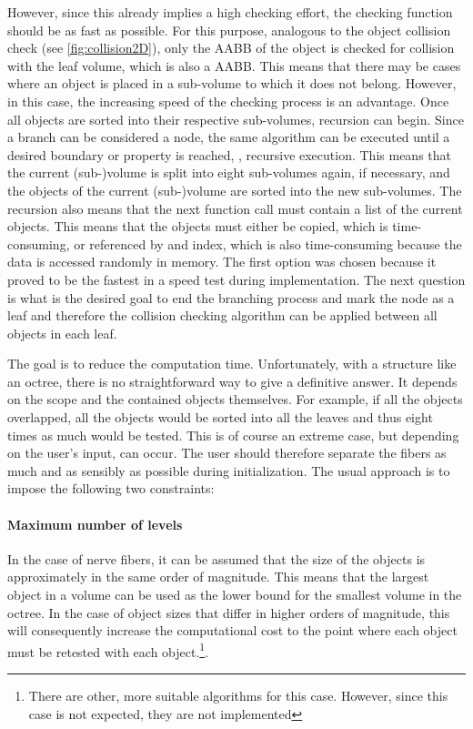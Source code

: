 However, since this already implies a high checking effort, the checking function should be as fast as possible.
For this purpose, analogous to the object collision check (see \cref{fig:collision2D}), only the \ac{AABB} of the object is checked for collision with the leaf volume, which is also a \ac{AABB}.
This means that there may be cases where an object is placed in a sub-volume to which it does not belong.
However, in this case, the increasing speed of the checking process is an advantage.
Once all objects are sorted into their respective sub-volumes, recursion can begin.
Since a branch can be considered a node, the same algorithm can be executed until a desired boundary or property is reached, \ie{}, recursive execution.
This means that the current (sub-)volume is split into eight sub-volumes again, if necessary, and the objects of the current (sub-)volume are sorted into the new sub-volumes.
The recursion also means that the next function call must contain a list of the current objects.
This means that the objects must either be copied, which is time-consuming, or referenced by \eg{} and index, which is also time-consuming because the data is accessed randomly in memory.
The first option was chosen because it proved to be the fastest in a speed test during implementation.
The next question is what is the desired goal to end the branching process and mark the node as a leaf and therefore the collision checking algorithm can be applied between all objects in each leaf.
\par
%
The goal is to reduce the computation time.
Unfortunately, with a structure like an octree, there is no straightforward way to give a definitive answer.
It depends on the scope and the contained objects themselves.
For example, if all the objects overlapped, all the objects would be sorted into all the leaves and thus eight times as much would be tested.
This is of course an extreme case, but depending on the user's input, can occur.
The user should therefore separate the fibers as much and as sensibly as possible during initialization.
The usual approach is to impose the following two constraints:
%
\paragraph{Maximum number of levels}
In the case of nerve fibers, it can be assumed that the size of the objects is approximately in the same order of magnitude.
This means that the largest object in a volume can be used as the lower bound for the smallest volume in the octree.
In the case of object sizes that differ in higher orders of magnitude, this will consequently increase the computational cost to the point where each object must be retested with each object.\footnote{There are other, more suitable algorithms for this case. However, since this case is not expected, they are not implemented}.
%
